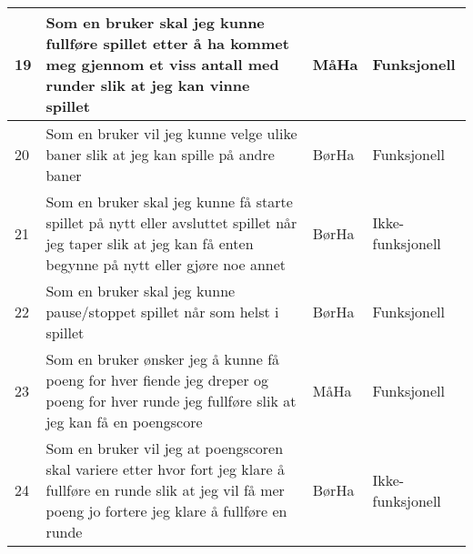 \documentclass[norsk,a4paper]{article}
\begin{document}
\begin{center}
\begin{tabular}{|m{} | m{} | m{2cm} | m{3cm} |}
    19 & Som en bruker skal jeg kunne fullføre spillet etter å ha kommet meg gjennom et viss antall med runder slik at jeg kan vinne spillet & MåHa & Funksjonell \\ \hline
    
    20 & Som en bruker vil jeg kunne velge ulike baner slik at jeg kan spille på andre baner & BørHa & Funksjonell \\ \hline
    
    21 & Som en bruker skal jeg kunne få starte spillet på nytt eller avsluttet spillet når jeg taper slik at jeg kan få enten begynne på nytt eller gjøre noe annet  & BørHa & Ikke-funksjonell \\ \hline
       
   22 & Som en bruker skal jeg kunne pause/stoppet spillet når som helst i spillet & BørHa & Funksjonell \\ \hline
   
   23 & Som en bruker ønsker jeg å kunne få poeng for hver fiende jeg dreper og poeng for hver runde jeg fullføre slik at jeg kan få en poengscore  & MåHa & Funksjonell 
   \\ \hline
   
   24 & Som en bruker vil jeg at poengscoren skal variere etter hvor fort jeg klare å fullføre en runde slik at jeg vil få mer poeng jo fortere jeg klare å fullføre en runde & BørHa & Ikke-funksjonell \\ \hline 
    
\end{tabular}
\end{center} 
\end{document}
